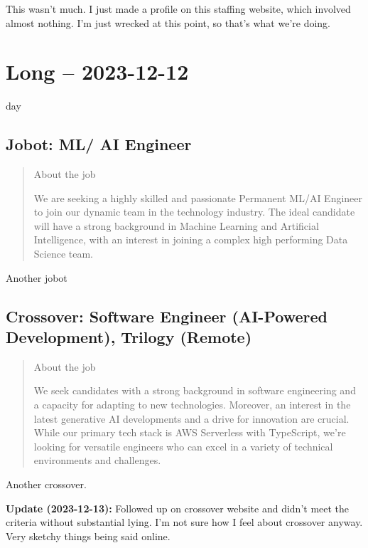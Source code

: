 \documentclass[
	letterpaper, %
	12pt, %
]{CSSullivanBusinessReport}
\begin{document}
This wasn't much. I just made a profile on this staffing website, which involved almost nothing. I'm just wrecked at this point, so that's what we're doing. 


\section[12 Dec: Short]{Long -- 2023-12-12} %

day


\subsection[Jobot]{Jobot: ML/ AI Engineer}

\begin{quote}
	About the job
	
	We are seeking a highly skilled and passionate Permanent ML/AI Engineer to join our dynamic team in the technology industry. The ideal candidate will have a strong background in Machine Learning and Artificial Intelligence, with an interest in joining a complex high performing Data Science team.

\end{quote}

Another jobot 


\subsection[Crossover]{Crossover: Software Engineer (AI-Powered Development), Trilogy (Remote)}

\begin{quote}
	About the job
	
	We seek candidates with a strong background in software engineering and a capacity for adapting to new technologies. Moreover, an interest in the latest generative AI developments and a drive for innovation are crucial. While our primary tech stack is AWS Serverless with TypeScript, we're looking for versatile engineers who can excel in a variety of technical environments and challenges.

\end{quote}

Another crossover. 

\textbf{Update (2023-12-13):} Followed up on crossover website and didn't meet the criteria without substantial lying. I'm not sure how I feel about crossover anyway. Very sketchy things being said online. 
\end{document}
